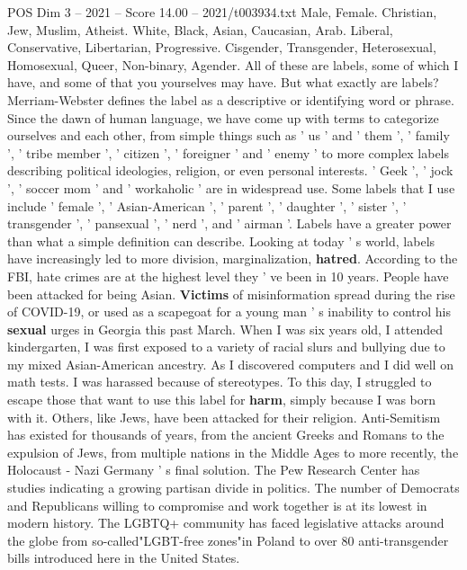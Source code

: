 \begin{textsample}{POS Dim 3 – 2021 – Score 14.00 – 2021/t003934.txt}  \label{ex:f3_pos_030}
Male, Female.
Christian, Jew, Muslim, Atheist.
White, Black, Asian, Caucasian, Arab.
Liberal, Conservative, Libertarian, Progressive.
Cisgender, Transgender, Heterosexual, Homosexual, Queer, Non-binary, Agender.
All of these are labels, some of which I have, and some of that you yourselves may have.
But what exactly are labels?
Merriam-Webster defines the label as a descriptive or identifying word or phrase.
Since the dawn of human language, we have come up with terms to categorize ourselves and each other, from simple things such as ' us ' and ' them ', ' family ', ' tribe member ', ' citizen ', ' foreigner ' and ' enemy ' to more complex labels describing political ideologies, religion, or even personal interests. ' Geek ', ' jock ', ' soccer mom ' and ' workaholic ' are in widespread use.
Some labels that I use include ' female ', ' Asian-American ', ' parent ', ' daughter ', ' sister ', ' transgender ', ' pansexual ', ' nerd ', and ' airman '.
Labels have a greater power than what a simple definition can describe.
Looking at today ' s world, labels have increasingly led to more division, marginalization, \textbf{hatred}.
According to the FBI, hate crimes are at the highest level they ' ve been in 10 years.
People have been attacked for being Asian. \textbf{Victims} of misinformation spread during the rise of COVID-19, or used as a scapegoat for a young man ' s inability to control his \textbf{sexual} urges in Georgia this past March.
When I was six years old, I attended kindergarten, I was first exposed to a variety of racial slurs and bullying due to my mixed Asian-American ancestry.
As I discovered computers and I did well on math tests.
I was harassed because of stereotypes.
To this day, I struggled to escape those that want to use this label for \textbf{harm}, simply because I was born with it.
Others, like Jews, have been attacked for their religion.
Anti-Semitism has existed for thousands of years, from the ancient Greeks and Romans to the expulsion of Jews, from multiple nations in the Middle Ages to more recently, the Holocaust - Nazi Germany ' s final solution.
The Pew Research Center has studies indicating a growing partisan divide in politics.
The number of Democrats and Republicans willing to compromise and work together is at its lowest in modern history.
The LGBTQ+ community has faced legislative attacks around the globe from so-called"LGBT-free zones"in Poland to over 80 anti-transgender bills introduced here in the United States.

\end{textsample}
